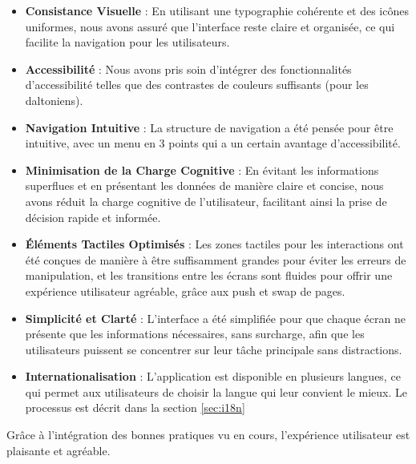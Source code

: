\begin{itemize}[noitemsep]
    \item \textbf{Consistance Visuelle} : En utilisant une typographie cohérente et des icônes uniformes, nous avons assuré que l'interface reste claire et organisée, ce qui facilite la navigation pour les utilisateurs.
    \item \textbf{Accessibilité} : Nous avons pris soin d'intégrer des fonctionnalités d'accessibilité telles que des contrastes de couleurs suffisants (pour les daltoniens).%

    \item \textbf{Navigation Intuitive} : La structure de navigation a été pensée pour être intuitive, avec un menu en 3 points qui a un certain avantage d'accessibilité.

    \item \textbf{Minimisation de la Charge Cognitive} : En évitant les informations superflues et en présentant les données de manière claire et concise, nous avons réduit la charge cognitive de l'utilisateur, facilitant ainsi la prise de décision rapide et informée.

    \item \textbf{Éléments Tactiles Optimisés} : Les zones tactiles pour les interactions ont été conçues de manière à être suffisamment grandes pour éviter les erreurs de manipulation, et les transitions entre les écrans sont fluides pour offrir une expérience utilisateur agréable, grâce aux push et swap de pages.

    \item \textbf{Simplicité et Clarté} : L'interface a été simplifiée pour que chaque écran ne présente que les informations nécessaires, sans surcharge, afin que les utilisateurs puissent se concentrer sur leur tâche principale sans distractions.

    \item \textbf{Internationalisation} : L'application est disponible en plusieurs langues, ce qui permet aux utilisateurs de choisir la langue qui leur convient le mieux. Le processus est décrit dans la section \ref{sec:i18n}
\end{itemize}

Grâce à l'intégration des bonnes pratiques vu en cours, l'expérience utilisateur est plaisante et agréable.
